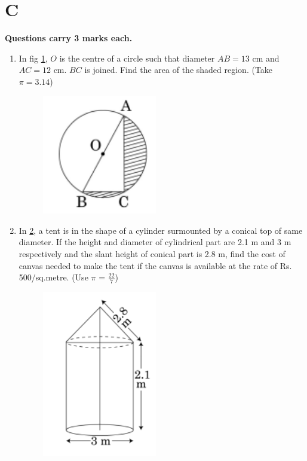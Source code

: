 \documentclass[book,11pt]{IEEEtran}
\renewcommand\thesection{\arabic{section}}
\begin{document}
\section{\textbf{C}}
\textbf{Questions carry 3 marks each.} \\
\begin{enumerate}[label=\thesection.\arabic*.,ref=\thesection.\theenumi]
\item  In fig \ref{figure_4}, $O$ is the centre of a circle such that diameter $AB = 13$ cm and $AC = 12$ cm. $BC$ is joined. Find the area of the shaded region. (Take $\pi = 3.14$)\\

	\begin{figure}[h!]
      \centering
      \includegraphics[width=5cm]{figs/4.png}
      \caption{}
      \label{figure_4}
\end{figure} 

\item  In \ref{figure_5}, a tent is in the shape of a cylinder surmounted by a conical top of same diameter. If the height and diameter of cylindrical part are 2.1 m and 3 m respectively and the slant height of conical part is 2.8 m, find the cost of canvas needed to make the tent if the canvas is available at the rate of Rs. 500/sq.metre. (Use $\pi$ = $\frac{22}{7}$)\\
	\begin{figure}[h!]
      \centering
      \includegraphics[width=5cm]{figs/5.png}
      \caption{}
      \label{figure_5}
\end{figure} 


\end{enumerate}
\end{document}
